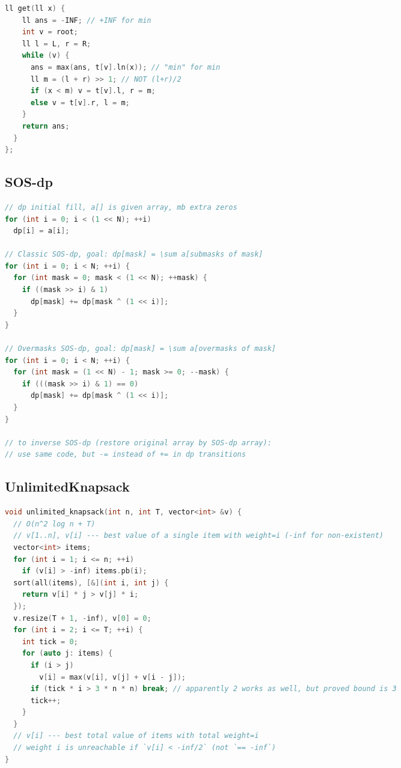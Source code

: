 \documentclass[8pt,a4paper,landscape,twosided]{extarticle}
\begin{document}
\begin{multicols*}{3}
\begin{lstlisting}[language=C++]
  ll get(ll x) {
    ll ans = -INF; // +INF for min
    int v = root;
    ll l = L, r = R;
    while (v) {
      ans = max(ans, t[v].ln(x)); // "min" for min
      ll m = (l + r) >> 1; // NOT (l+r)/2
      if (x < m) v = t[v].l, r = m;
      else v = t[v].r, l = m;
    }
    return ans;
  }
};
\end{lstlisting}

\subsection{SOS-dp}
\begin{lstlisting}[language=C++]
// dp initial fill, a[] is given array, mb extra zeros
for (int i = 0; i < (1 << N); ++i)
  dp[i] = a[i];

// Classic SOS-dp, goal: dp[mask] = \sum a[submasks of mask]
for (int i = 0; i < N; ++i) {
  for (int mask = 0; mask < (1 << N); ++mask) {
    if ((mask >> i) & 1)
      dp[mask] += dp[mask ^ (1 << i)];
  }
}

// Overmasks SOS-dp, goal: dp[mask] = \sum a[overmasks of mask]
for (int i = 0; i < N; ++i) {
  for (int mask = (1 << N) - 1; mask >= 0; --mask) {
    if (((mask >> i) & 1) == 0)
      dp[mask] += dp[mask ^ (1 << i)];
  }
}

// to inverse SOS-dp (restore original array by SOS-dp array):
// use same code, but -= instead of += in dp transitions
\end{lstlisting}

\subsection{UnlimitedKnapsack}
\begin{lstlisting}[language=C++]
void unlimited_knapsack(int n, int T, vector<int> &v) {
  // O(n^2 log n + T)
  // v[1..n], v[i] --- best value of a single item with weight=i (-inf for non-existent)
  vector<int> items;
  for (int i = 1; i <= n; ++i)
    if (v[i] > -inf) items.pb(i);
  sort(all(items), [&](int i, int j) {
    return v[i] * j > v[j] * i;
  });
  v.resize(T + 1, -inf), v[0] = 0;
  for (int i = 2; i <= T; ++i) {
    int tick = 0;
    for (auto j: items) {
      if (i > j)
        v[i] = max(v[i], v[j] + v[i - j]);
      if (tick * i > 3 * n * n) break; // apparently 2 works as well, but proved bound is 3
      tick++;
    }
  }
  // v[i] --- best total value of items with total weight=i
  // weight i is unreachable if `v[i] < -inf/2` (not `== -inf`)
}
\end{lstlisting}


\end{multicols*}
\end{document}
